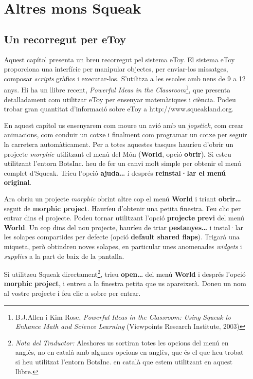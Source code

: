\part{Altres mons Squeak}


\chapter{Un recorregut per eToy}
\label{cap24}

Aquest capítol presenta un breu recorregut pel sistema eToy. El sistema eToy proporciona una interfície per manipular objectes, per enviar-los missatges, composar \emph{scripts} gràfics i executar-los. S'utilitza a les escoles amb nens de 9 a 12 anys. Hi
 ha un llibre recent, \emph{Powerful Ideas in the Classroom}\footnote{B.J.Allen i Kim Rose, \emph{Powerful Ideas in the Classroom: Using Squeak to Enhance Math and Science Learning} (Viewpoints Research Institute, 2003)}, que presenta detalladament com utilitzar eToy per ensenyar matemàtiques i ciència. Podeu trobar gran quantitat d'informació sobre eToy a \textsf{http://www.squeakland.org}. 

En aquest capítol us ensenyarem com moure un avió amb un \emph{joystick}, com crear animacions, com conduir un cotxe i finalment com programar un cotxe per seguir la carretera automàticament. Per a totes aquestes tasques hauríeu d'obrir un projecte \emph{morphic} utilitzant el menú del Món (\textbf{World}, opció \textbf{obrir}). Si esteu utilitzant l'entorn BotsInc. heu de fer un canvi molt simple per obtenir el menú complet d'Squeak. Trieu l'opció \textbf{ajuda\dots} i després \textbf{reinstal·lar el menú original}. 

Ara obriu un projecte \emph{morphic} obrint altre cop el menú \textbf{World} i triant \textbf{obrir\dots} seguit de \textbf{morphic project}. Hauríeu d'obtenir una petita finestra. Feu clic per entrar dins el projecte. Podeu tornar utilitzant l'opció \textbf{projecte previ} del menú \textbf{World}. Un cop dins del nou projecte, hauríeu de triar \textbf{pestanyes\dots} i instal·lar les solapes compartides per defecte (opció \textbf{default shared flaps}). Trigarà una miqueta, però obtindreu noves solapes, en particular unes anomenades \emph{widgets} i \emph{supplies} a la part de baix de la pantalla.

Si utilitzeu Squeak directament\footnote{\emph{Nota del Traductor:} Aleshores us sortiran totes les opcions del menú en anglès, no en català amb algunes opcions en anglès, que és el que heu trobat si heu utilitzat l'entorn BotsInc. en català que estem utilitzant en aquest llibre.}, trieu \textbf{open\dots} del menú \textbf{World} i després l'opció \textbf{morphic project}, i entreu a la finestra petita que us apareixerà. Doneu un nom al vostre projecte i feu clic a sobre per entrar.

